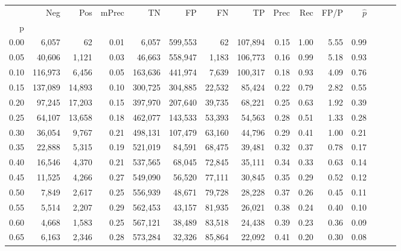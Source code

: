 \begin{tabular}{rrrrrrrrrrrrrrr}
\toprule
{} &      Neg &     Pos & mPrec &       TN &       FP &       FN &       TP &  Prec &   Rec &  FP/P & $\hat{p}$ \\
p    &          &         &       &          &          &          &          &       &       &       &           \\
\midrule
0.00 &    6,057 &      62 &  0.01 &    6,057 &  599,553 &       62 &  107,894 &  0.15 &  1.00 &  5.55 &      0.99 \\
0.05 &   40,606 &   1,121 &  0.03 &   46,663 &  558,947 &    1,183 &  106,773 &  0.16 &  0.99 &  5.18 &      0.93 \\
0.10 &  116,973 &   6,456 &  0.05 &  163,636 &  441,974 &    7,639 &  100,317 &  0.18 &  0.93 &  4.09 &      0.76 \\
0.15 &  137,089 &  14,893 &  0.10 &  300,725 &  304,885 &   22,532 &   85,424 &  0.22 &  0.79 &  2.82 &      0.55 \\
0.20 &   97,245 &  17,203 &  0.15 &  397,970 &  207,640 &   39,735 &   68,221 &  0.25 &  0.63 &  1.92 &      0.39 \\
0.25 &   64,107 &  13,658 &  0.18 &  462,077 &  143,533 &   53,393 &   54,563 &  0.28 &  0.51 &  1.33 &      0.28 \\
0.30 &   36,054 &   9,767 &  0.21 &  498,131 &  107,479 &   63,160 &   44,796 &  0.29 &  0.41 &  1.00 &      0.21 \\
0.35 &   22,888 &   5,315 &  0.19 &  521,019 &   84,591 &   68,475 &   39,481 &  0.32 &  0.37 &  0.78 &      0.17 \\
0.40 &   16,546 &   4,370 &  0.21 &  537,565 &   68,045 &   72,845 &   35,111 &  0.34 &  0.33 &  0.63 &      0.14 \\
0.45 &   11,525 &   4,266 &  0.27 &  549,090 &   56,520 &   77,111 &   30,845 &  0.35 &  0.29 &  0.52 &      0.12 \\
0.50 &    7,849 &   2,617 &  0.25 &  556,939 &   48,671 &   79,728 &   28,228 &  0.37 &  0.26 &  0.45 &      0.11 \\
0.55 &    5,514 &   2,207 &  0.29 &  562,453 &   43,157 &   81,935 &   26,021 &  0.38 &  0.24 &  0.40 &      0.10 \\
0.60 &    4,668 &   1,583 &  0.25 &  567,121 &   38,489 &   83,518 &   24,438 &  0.39 &  0.23 &  0.36 &      0.09 \\
0.65 &    6,163 &   2,346 &  0.28 &  573,284 &   32,326 &   85,864 &   22,092 &  0.41 &  0.20 &  0.30 &      0.08 \\

\end{tabular}
